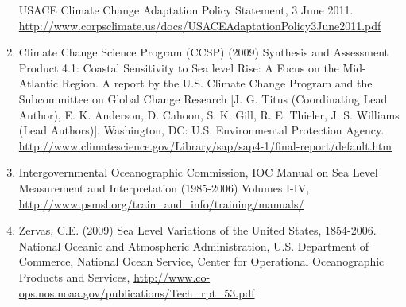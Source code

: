 \documentclass[10pt]{amsart}
\begin{document}
\begin{enumerate}
USACE Climate Change Adaptation Policy Statement, 3 June 2011. \url{http://www.corpsclimate.us/docs/USACEAdaptationPolicy3June2011.pdf}
\item Climate Change Science Program (CCSP) (2009) Synthesis and Assessment Product 4.1: Coastal Sensitivity to Sea level Rise: A Focus on the Mid-Atlantic Region. A report by the U.S. Climate Change Program and the Subcommittee on Global Change Research [J. G. Titus (Coordinating Lead Author), E. K. Anderson, D. Cahoon, S. K. Gill, R. E. Thieler, J. S. Williams (Lead Authors)]. Washington, DC: U.S. Environmental Protection Agency. \url{http://www.climatescience.gov/Library/sap/sap4-1/final-report/default.htm}
\item Intergovernmental Oceanographic Commission, IOC Manual on Sea Level Measurement and Interpretation (1985-2006) Volumes I-IV, \url{http://www.psmsl.org/train_and_info/training/manuals/}
\item Zervas, C.E. (2009) Sea Level Variations of the United States, 1854-2006. National Oceanic and Atmospheric Administration, U.S. Department of Commerce, National Ocean Service, Center for Operational Oceanographic Products and Services, \url{http://www.co-ops.nos.noaa.gov/publications/Tech_rpt_53.pdf}
\end{enumerate}
\end{document}
